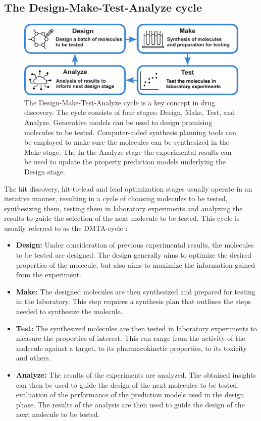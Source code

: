 \subsection{The Design-Make-Test-Analyze cycle}
\begin{figure}
      \centering
      \includegraphics[width=\textwidth]{figures/dmta_cycle_v2.pdf}
      \caption{The Design-Make-Test-Analyze cycle is a key concept in drug discovery. The cycle
            consists of four stages: Design, Make, Test, and Analyze. Generative models can be used
            to design promising molecules to be tested. Computer-aided synthesis planning tools can
            be employed to make sure the molecules can be synthesized in the Make stage. The
            In the Analyze stage the experimental results can be used to update the property prediction
            models underlying the Design stage.
            \label{fig:dmta-cycle}}
\end{figure}
The hit discovery, hit-to-lead and lead optimization stages usually operate in an iterative manner,
resulting in a cycle of choosing molecules to be tested, synthesizing them, testing them in
laboratory experiments and analyzing the results to guide the selection of the next molecule to be
tested. This cycle is usually referred to as the \ac{DMTA}-cycle \citep{wesolowskiStrategiesPoliticsSuccessful2016}:
\begin{itemize}
      \item \textbf{Design:} Under consideration of previous experimental results, the molecules to
            be tested are designed. The design generally aims to optimize the desired properties of
            the molecule, but also aims to maximize the information gained from the experiment.
      \item \textbf{Make:} The designed molecules are then synthesized and prepared for testing in
            the laboratory. This step requires a synthesis plan that outlines the steps needed to
            synthesize the molecule.
      \item \textbf{Test:} The synthesized molecules are then tested in laboratory experiments to
            measure the properties of interest. This can range from the activity of the molecule
            against a target, to its pharmacokinetic properties, to its toxicity and others.
      \item \textbf{Analyze:} The results of the experiments are analyzed. The obtained insights
            can then be used to guide the design of the next molecules to be tested.
            evaluation of the performance of the prediction models used in the design phase. The
            results of the analysis are then used to guide the design of the next molecule to be
            tested.
\end{itemize}

